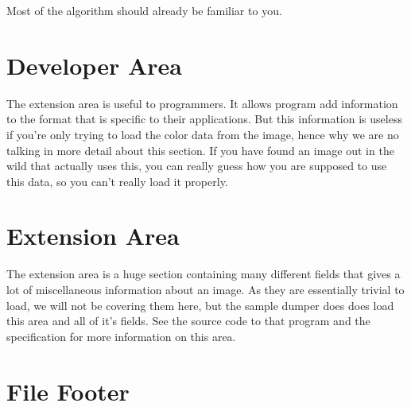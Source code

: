 \begin{refsection}
\begin{algorithm}[H]
\begin{algorithmic}[1]
              \EndIf

              \process


            \EndRepeatn

          \EndIf
        \Else


          \EndIf

          \process


        \EndIf
      \EndWhile
    \end{algorithmic}
  \end{algorithm}

  Most of the algorithm should already be familiar to you.

  \section{Developer Area}

  The extension area is useful to programmers. It allows program add
  information to the \tga format that is specific to their
  applications. But this information is useless if you're only trying
  to load the color data from the \tga image, hence why we are no
  talking in more detail about this section. If you have found an
  \tga image out in the wild that actually uses this, you can really
  guess how you are supposed to use this data, so you can't really
  load it properly.

  \section{Extension Area}

  The extension area is a huge section containing many different
  fields that gives a lot of miscellaneous information about an
  image. As they are essentially trivial to load, we will not be
  covering them here, but the sample \tga dumper does does load this
  area and all of it's fields. See the source code to that program and
  the \tga specification for more information on this area.

  \section{\tga File Footer}


\end{refsection}

